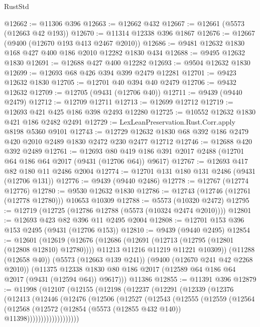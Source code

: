 \begin{lexlean}{RustStd}
\begin{coremodule}
@12662 := @11306 @396
@12663 := @12662 @432
@12667 := @12661 (@5573 (@12663 @42 @193))
@12670 := @11314 @12338 @396 @1867
@12676 := @12667 (@9400 (@12670 @193 @413 @2467 @2010))
@12686 := @9481 @12632 @1830 @168 @427 @400 @186 @2010 @12282 @1830 @434
@12688 := @9495 @12632 @1830
@12691 := @12688 @427 @400 @12282
@12693 := @9504 @12632 @1830
@12699 := @12693 @68 @426 @394 @399 @2479 @12281
@12701 := @9423 @12632 @1830
@12705 := @12701 @40 @394 @40 @2479
@12706 := @9432 @12632
@12709 := @12705 (@9431 (@12706 @40))
@12711 := @9439 (@9440 @2479)
@12712 := @12709 @12711
@12713 := @12699 @12712
@12719 := @12693 @421 @425 @186 @398 @2493 @12280
@12725 := @10552 @12632 @1830 @421 @186 @2482 @2491
@12729 := LexLeanPreservation.Rust.Corr.apply @8198 @5360 @9101
@12743 := @12729 @12632 @1830 @68 @392 @186 @2479 @420 @2010 @2489 @1830 @2472 @230 @2477 @12712
@12746 := @12688 @420 @392 @2489
@12761 := @12693
    @80
    @419
    @186
    @391
    @2017
    @2488
    (@12701 @64 @186 @64 @2017 (@9431 (@12706 @64)) @9617)
@12767 := @12693 @417 @82 @180 @11 @2486 @2004
@12774 := @12701 @131 @180 @131 @2486 (@9431 (@12706 @131))
@12776 := @9439 (@9440 @2486)
@12778 := @12767 (@12774 @12776)
@12780 := @9530 @12632 @1830
@12786 := @12743 (@12746 (@12761 (@12778 @12780))) @10653 @10309
@12788 := @5573 (@10320 @2472)
@12795 := @12719 (@12725 (@12786 @12788 (@5573 (@10324 @2474 @2010))))
@12801 := @12693 @423 @82 @396 @11 @2495 @2004
@12808 := @12701 @153 @396 @153 @2495 (@9431 (@12706 @153))
@12810 := @9439 (@9440 @2495)
@12854 := @12601
    (@12619
      (@12676
        (@12686
          (@12691 (@12713 (@12795 (@12801 (@12808 @12810) @12780))))
          @11213
          @11216
          @11219
          @11221
          @10309))
      (@11288 (@12658 @40))
      (@5573 (@12663 @139 @241))
      (@9400 (@12670 @241 @42 @2268 @2010))
      (@11375 @12338 @1830 @80 @186 @2017 (@12589 @64 @186 @64 @2017 (@9431 (@12594 @64)) @9617)))
    @11386
@12855 := @11391 @396
@12879 := @11998
    (@12107
      (@12155
        (@12198
          (@12237
            (@12291
              (@12339
                (@12376
                  (@12413
                    (@12446
                      (@12476
                        (@12506
                          (@12527
                            (@12543
                              (@12555
                                (@12559
                                  (@12564
                                    (@12568
                                      (@12572
                                        (@12854 (@5573 (@12855 @432 @140)) @11398)))))))))))))))))))

\end{coremodule}
\end{lexlean}
